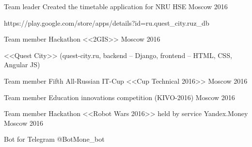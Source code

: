 


\begin{cventries}


\cventry
{Team leader} %
{Created the timetable application for NRU HSE} %
{Moscow} %
{2016} %
{ %
	\begin{cvitems}
		\item {https://play.google.com/store/apps/details?id=ru.quest\_city.ruz\_db}
	\end{cvitems}
}



\cventry
{Team member} %
{Hackathon <<2GIS>>} %
{Moscow} %
{2016} %
{ %
\begin{cvitems}
\item {<<Quest City>> (quest-city.ru, backend – Django, frontend – HTML, CSS, Angular JS)}
\end{cvitems}
}


\cventry
{Team member} %
{Fifth All-Russian IT-Cup <<Cup Technical 2016>>} %
{Moscow} %
{2016} %
{ %
}


\cventry
{Team member} %
{Education innovations competition (KIVO-2016)} %
{Moscow} %
{2016} %
{ %
}


\cventry
{Team member} %
{Hackathon <<Robot Wars 2016>> held by service Yandex.Money} %
{Moscow} %
{2016} %
{ %
\begin{cvitems}
\item {Bot for Telegram @BotMone\_bot}
\end{cvitems}
}


\end{cventries}
